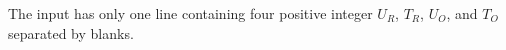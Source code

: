 The input has only one line containing
four positive integer $U_R$, $T_R$, $U_O$, and $T_O$ separated by blanks.

